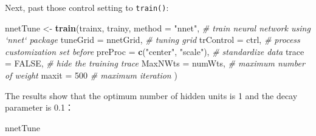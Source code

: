 \documentclass[]{book}
\newenvironment{Shaded}{\begin{snugshade}}{\end{snugshade}}
\newcommand{\KeywordTok}[1]{\textcolor[rgb]{0.13,0.29,0.53}{\textbf{{#1}}}}
\newcommand{\DataTypeTok}[1]{\textcolor[rgb]{0.13,0.29,0.53}{{#1}}}
\newcommand{\DecValTok}[1]{\textcolor[rgb]{0.00,0.00,0.81}{{#1}}}
\newcommand{\StringTok}[1]{\textcolor[rgb]{0.31,0.60,0.02}{{#1}}}
\newcommand{\CommentTok}[1]{\textcolor[rgb]{0.56,0.35,0.01}{\textit{{#1}}}}
\newcommand{\OtherTok}[1]{\textcolor[rgb]{0.56,0.35,0.01}{{#1}}}
\newcommand{\NormalTok}[1]{{#1}}
\theoremstyle{definition}
\theoremstyle{definition}
\theoremstyle{remark}
\begin{document}
Next, past those control setting to \texttt{train()}:

\begin{Shaded}
\begin{Highlighting}[]
\NormalTok{nnetTune <-}\StringTok{ }\KeywordTok{train}\NormalTok{(trainx, trainy,}
                   \DataTypeTok{method =} \StringTok{"nnet"}\NormalTok{, }\CommentTok{# train neural network using `nnet` package }
                   \DataTypeTok{tuneGrid =} \NormalTok{nnetGrid, }\CommentTok{# tuning grid}
                   \DataTypeTok{trControl =} \NormalTok{ctrl, }\CommentTok{# process customization set before}
                   \DataTypeTok{preProc =} \KeywordTok{c}\NormalTok{(}\StringTok{"center"}\NormalTok{, }\StringTok{"scale"}\NormalTok{), }\CommentTok{# standardize data}
                   \DataTypeTok{trace =} \OtherTok{FALSE}\NormalTok{,  }\CommentTok{# hide the training trace}
                   \DataTypeTok{MaxNWts =} \NormalTok{numWts,  }\CommentTok{# maximum number of weight}
                   \DataTypeTok{maxit =} \DecValTok{500} \CommentTok{# maximum iteration}
\NormalTok{)}
\end{Highlighting}
\end{Shaded}

The results show that the optimum number of hidden units is 1 and the
decay parameter is 0.1：

\begin{Shaded}
\begin{Highlighting}[]
\NormalTok{nnetTune}
\end{Highlighting}
\end{Shaded}
\end{document}
